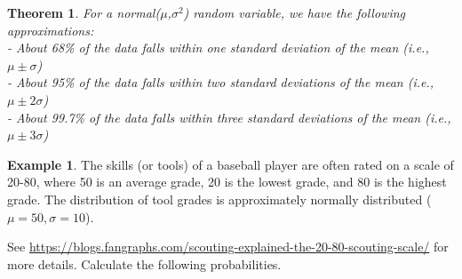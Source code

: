 \documentclass[
  11pt,
]{book}
\newtheorem{theorem}{Theorem}[chapter]
\theoremstyle{definition}
\theoremstyle{definition}
\newtheorem{example}{Example}[chapter]
\theoremstyle{definition}
\theoremstyle{definition}
\theoremstyle{remark}
\begin{document}
\begin{theorem}
For a normal(\(\mu\),\(\sigma^2\)) random variable, we have the following approximations:\\
- About 68\% of the data falls within one standard deviation of the mean (i.e., \(\mu \pm \sigma\))\\
- About 95\% of the data falls within two standard deviations of the mean (i.e., \(\mu \pm 2\sigma\))\\
- About 99.7\% of the data falls within three standard deviations of the mean (i.e., \(\mu \pm 3\sigma\))
\end{theorem}

\begin{example}
The skills (or tools) of a baseball player are often rated on a scale of 20-80, where 50 is an average grade, 20 is the lowest grade, and 80 is the highest grade. The distribution of tool grades is approximately normally distributed (\(\mu=50, \sigma =10\)).

See \url{https://blogs.fangraphs.com/scouting-explained-the-20-80-scouting-scale/} for more details. Calculate the following probabilities.
\end{example}
\end{document}
